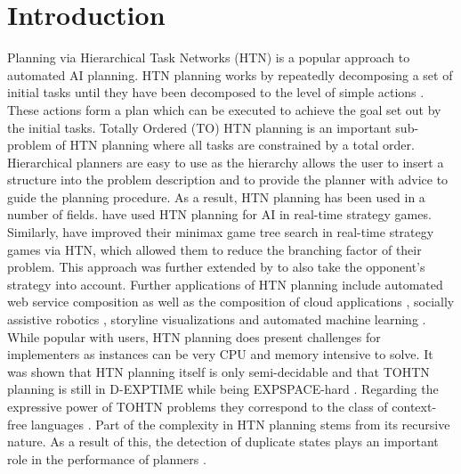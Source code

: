 \documentclass[enabledeprecatedfontcommands,12pt,a4paper,twoside]{scrartcl}
\numberwithin{equation}{section}
\begin{document}
\section{Introduction}
Planning via Hierarchical Task Networks (HTN) is a popular approach to automated AI planning. HTN planning works by repeatedly decomposing a set of initial tasks until they have been decomposed to the level of simple actions \cite{georgievski2015htn, bercher2019survey}. These actions form a plan which can be executed to achieve the goal set out by the initial tasks. Totally Ordered (TO) HTN planning is an important sub-problem of HTN planning where all tasks are constrained by a total order. \\
Hierarchical planners are easy to use as the hierarchy allows the user to insert a structure into the problem description and to provide the planner with advice to guide the planning procedure. As a result, HTN planning has been used in a number of fields. \cite{munoz2004role} have used HTN planning for AI in real-time strategy games. Similarly, \cite{ontanon2015adversarial} have improved their minimax game tree search in real-time strategy games via HTN, which allowed them to reduce the branching factor of their problem. This approach was further extended by \cite{lin2020htn} to also take the opponent's strategy into account. Further applications of HTN planning include automated web service composition \cite{sirin2004htn} as well as the composition of cloud applications \cite{georgievski2017cloud}, socially assistive robotics \cite{gonzalez2017three}, storyline visualizations \cite{padia2018yarn} and automated machine learning \cite{mohr2018ml}. \\
While popular with users, HTN planning does present challenges for implementers as instances can be very CPU and memory intensive to solve. It was shown that HTN planning itself is only semi-decidable and that TOHTN planning is still in D-EXPTIME while being EXPSPACE-hard \cite{erol1994htn, erol1996complexity}. Regarding the expressive power of TOHTN problems they correspond to the class of context-free languages \cite{holler2014language}. Part of the complexity in HTN planning stems from its recursive nature. As a result of this, the detection of duplicate states plays an important role in the performance of planners \cite{holler2021loop}. \\
\end{document}

